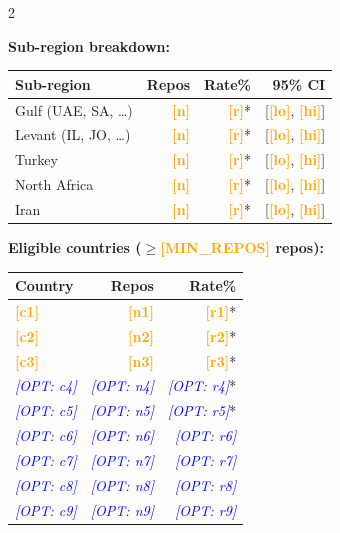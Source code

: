 \documentclass[10pt,a4paper]{article}
\newcommand{\FILLIN}[1]{\textcolor{orange}{\textbf{[#1]}}}
\newcommand{\OPT}[1]{\textcolor{blue}{\textit{[OPT: #1]}}}
\begin{document}
\begin{multicols}{2}

\textbf{Sub-region breakdown:}

\begin{tabular}{@{}lrrr@{}}
\toprule
Sub-region & Repos & Rate\% & 95\% CI \\
\midrule
Gulf (UAE, SA, \ldots)  & \FILLIN{n} & \FILLIN{r}* & [\FILLIN{lo}, \FILLIN{hi}] \\
Levant (IL, JO, \ldots) & \FILLIN{n} & \FILLIN{r}* & [\FILLIN{lo}, \FILLIN{hi}] \\
Turkey                  & \FILLIN{n} & \FILLIN{r}* & [\FILLIN{lo}, \FILLIN{hi}] \\
North Africa            & \FILLIN{n} & \FILLIN{r}* & [\FILLIN{lo}, \FILLIN{hi}] \\
Iran                    & \FILLIN{n} & \FILLIN{r}* & [\FILLIN{lo}, \FILLIN{hi}] \\
\bottomrule
\end{tabular}

\columnbreak

\textbf{Eligible countries ($\geq$\FILLIN{MIN\_REPOS} repos):}

\begin{tabular}{@{}lrr@{}}
\toprule
Country & Repos & Rate\% \\
\midrule
\FILLIN{c1} & \FILLIN{n1} & \FILLIN{r1}* \\
\FILLIN{c2} & \FILLIN{n2} & \FILLIN{r2}* \\
\FILLIN{c3} & \FILLIN{n3} & \FILLIN{r3}* \\
\OPT{c4}    & \OPT{n4}    & \OPT{r4}*    \\
\OPT{c5}    & \OPT{n5}    & \OPT{r5}*    \\
\OPT{c6}    & \OPT{n6}    & \OPT{r6}     \\
\OPT{c7}    & \OPT{n7}    & \OPT{r7}     \\
\OPT{c8}    & \OPT{n8}    & \OPT{r8}     \\
\OPT{c9}    & \OPT{n9}    & \OPT{r9}     \\
\bottomrule
\end{tabular}

\end{multicols}

\end{document}
